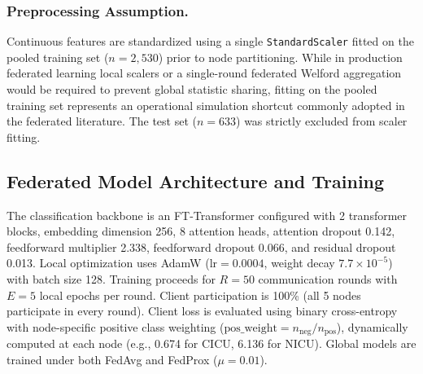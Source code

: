 \documentclass[conference,a4paper]{IEEEtran}
\begin{document}
\subsubsection{Preprocessing Assumption.} Continuous features are standardized using a single \texttt{StandardScaler} fitted on the pooled training set ($n = 2{,}530$) prior to node partitioning. While in production federated learning local scalers or a single-round federated Welford aggregation would be required to prevent global statistic sharing, fitting on the pooled training set represents an operational simulation shortcut commonly adopted in the federated literature. The test set ($n = 633$) was strictly excluded from scaler fitting.

\subsection{Federated Model Architecture and Training}
The classification backbone is an FT-Transformer \cite{gorishniy2021revisiting} configured with 2 transformer blocks, embedding dimension 256, 8 attention heads, attention dropout 0.142, feedforward multiplier 2.338, feedforward dropout 0.066, and residual dropout 0.013. Local optimization uses AdamW ($\text{lr} = 0.0004$, weight decay $7.7\times 10^{-5}$) with batch size 128. Training proceeds for $R = 50$ communication rounds with $E = 5$ local epochs per round. Client participation is 100\% (all 5 nodes participate in every round). Client loss is evaluated using binary cross-entropy with node-specific positive class weighting ($\text{pos\_weight} = n_{\text{neg}} / n_{\text{pos}}$), dynamically computed at each node (e.g., 0.674 for CICU, 6.136 for NICU). Global models are trained under both FedAvg and FedProx ($\mu = 0.01$).
\end{document}
